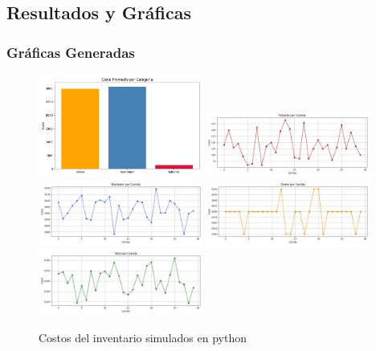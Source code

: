 \documentclass[12pt]{article}
\begin{document}
\subsection{Resultados y Gráficas}
\subsubsection*{Gráficas Generadas}

\begin{figure}[H]
    \centering
    \includegraphics[width=0.48\textwidth]{graficas/costos/costos_promedio.png}
    \includegraphics[width=0.48\textwidth]{graficas/costos/faltante_por_corrida.png}
    \includegraphics[width=0.48\textwidth]{graficas/costos/mantener_por_corrida.png}
    \includegraphics[width=0.48\textwidth]{graficas/costos/orden_por_corrida.png}
    \includegraphics[width=0.48\textwidth]{graficas/costos/total_por_corrida.png}
    
    \caption{Costos del inventario simulados en python}
\end{figure}
\end{document}
